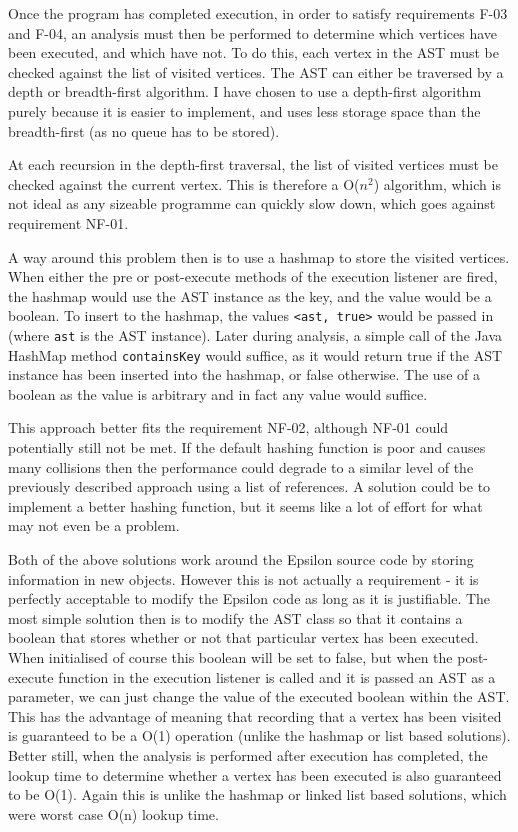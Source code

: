 Once the program has completed execution, in order to satisfy requirements F-03 and F-04, an analysis must then be performed to determine which vertices have been executed, and which have not. To do this, each vertex in the AST must be checked against the list of visited vertices. The AST can either be traversed by a depth or breadth-first algorithm. I have chosen to use a depth-first algorithm purely because it is easier to implement, and uses less storage space than the breadth-first (as no queue has to be stored).

At each recursion in the depth-first traversal, the list of visited vertices must be checked against the current vertex. This is therefore a O($n^2$) algorithm, which is not ideal as any sizeable programme can quickly slow down, which goes against requirement NF-01. 

A way around this problem then is to use a hashmap to store the visited vertices. When either the pre or post-execute methods of the execution listener are fired, the hashmap would use the AST instance as the key, and the value would be a boolean. To insert to the hashmap, the values \verb|<ast, true>| would be passed in (where \verb|ast| is the AST instance). Later during analysis, a simple call of the Java HashMap method \verb|containsKey| would suffice, as it would return true if the AST instance has been inserted into the hashmap, or false otherwise. The use of a boolean as the value is arbitrary and in fact any value would suffice. 

This approach better fits the requirement NF-02, although NF-01 could potentially still not be met. If the default hashing function is poor and causes many collisions then the performance could degrade to a similar level of the previously described approach using a list of references. A solution could be to implement a better hashing function, but it seems like a lot of effort for what may not even be a problem.

Both of the above solutions work around the Epsilon source code by storing information in new objects. However this is not actually a requirement - it is perfectly acceptable to modify the Epsilon code as long as it is justifiable. The most simple solution then is to modify the AST class so that it contains a boolean that stores whether or not that particular vertex has been executed. When initialised of course this boolean will be set to false, but when the post-execute function in the execution listener is called and it is passed an AST as a parameter, we can just change the value of the executed boolean within the AST. This has the advantage of meaning that recording that a vertex has been visited is guaranteed to be a O(1) operation (unlike the hashmap or list based solutions). Better still, when the analysis is performed after execution has completed, the lookup time to determine whether a vertex has been executed is also guaranteed to be O(1). Again this is unlike the hashmap or linked list based solutions, which were worst case O(n) lookup time.

